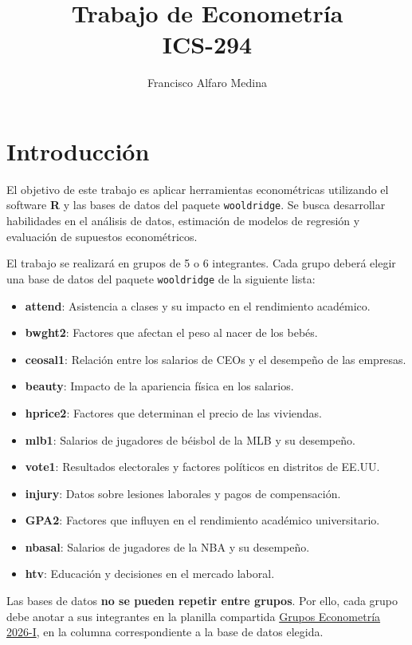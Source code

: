 \documentclass[11pt,a4paper]{article}
\title{\textbf{Trabajo de Econometría}\\\large ICS-294}
\author{Francisco Alfaro Medina}
\date{}
\begin{document}
\thispagestyle{fancy}
\maketitle

\section*{Introducción}

El objetivo de este trabajo es aplicar herramientas econométricas utilizando el software \textbf{R} y las bases de datos del paquete \texttt{wooldridge}. Se busca desarrollar habilidades en el análisis de datos, estimación de modelos de regresión y evaluación de supuestos econométricos.

El trabajo se realizará en grupos de 5 o 6 integrantes. Cada grupo deberá elegir una base de datos del paquete \texttt{wooldridge} de la siguiente lista:

\begin{itemize}
    \item \textbf{attend}: Asistencia a clases y su impacto en el rendimiento académico.
    \item \textbf{bwght2}: Factores que afectan el peso al nacer de los bebés.
    \item \textbf{ceosal1}: Relación entre los salarios de CEOs y el desempeño de las empresas.
    \item \textbf{beauty}: Impacto de la apariencia física en los salarios.
    \item \textbf{hprice2}: Factores que determinan el precio de las viviendas.
    \item \textbf{mlb1}: Salarios de jugadores de béisbol de la MLB y su desempeño.
    \item \textbf{vote1}: Resultados electorales y factores políticos en distritos de EE.UU.
    \item \textbf{injury}: Datos sobre lesiones laborales y pagos de compensación.
    \item \textbf{GPA2}: Factores que influyen en el rendimiento académico universitario.
    \item \textbf{nbasal}: Salarios de jugadores de la NBA y su desempeño.
    \item \textbf{htv}: Educación y decisiones en el mercado laboral.
\end{itemize}

Las bases de datos \textbf{no se pueden repetir entre grupos}. Por ello, cada grupo debe anotar a sus integrantes en la planilla compartida \href{https://docs.google.com/spreadsheets/d/1NI2CzwLY366fZft4j1RXH3JG4dCJMYc58QUd5BpT75A/edit?usp=sharing}{Grupos Econometría 2026-I}, en la columna correspondiente a la base de datos elegida.
\end{document}

